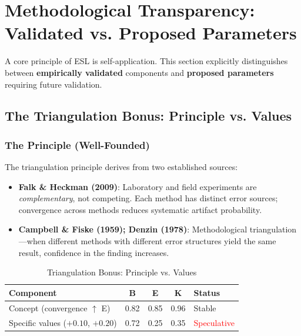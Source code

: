 \documentclass[11pt,a4paper]{article}
\begin{document}
\section{Methodological Transparency: Validated vs. Proposed Parameters}
\label{sec:transparency}


A core principle of ESL is self-application. This section explicitly distinguishes between \textbf{empirically validated} components and \textbf{proposed parameters} requiring future validation.

\subsection{The Triangulation Bonus: Principle vs. Values}

\subsubsection{The Principle (Well-Founded)}

The triangulation principle derives from two established sources:

\begin{itemize}
    \item \textbf{Falk \& Heckman (2009)}: Laboratory and field experiments are \textit{complementary}, not competing. Each method has distinct error sources; convergence across methods reduces systematic artifact probability.
    \item \textbf{Campbell \& Fiske (1959); Denzin (1978)}: Methodological triangulation---when different methods with different error structures yield the same result, confidence in the finding increases.
\end{itemize}

\begin{table}[h]
\centering
\caption{Triangulation Bonus: Principle vs. Values}
\label{tab:tri-validation}
\begin{tabular}{lcccl}
\toprule
\textbf{Component} & \textbf{B} & \textbf{E} & \textbf{K} & \textbf{Status} \\
\midrule
Concept (convergence $\uparrow$ E) & 0.82 & 0.85 & 0.96 & \textcolor{green!60!black}{Stable} \\
Specific values ($+0.10$, $+0.20$) & 0.72 & 0.25 & 0.35 & \textcolor{red}{Speculative} \\
\bottomrule
\end{tabular}
\end{table}
\end{document}
